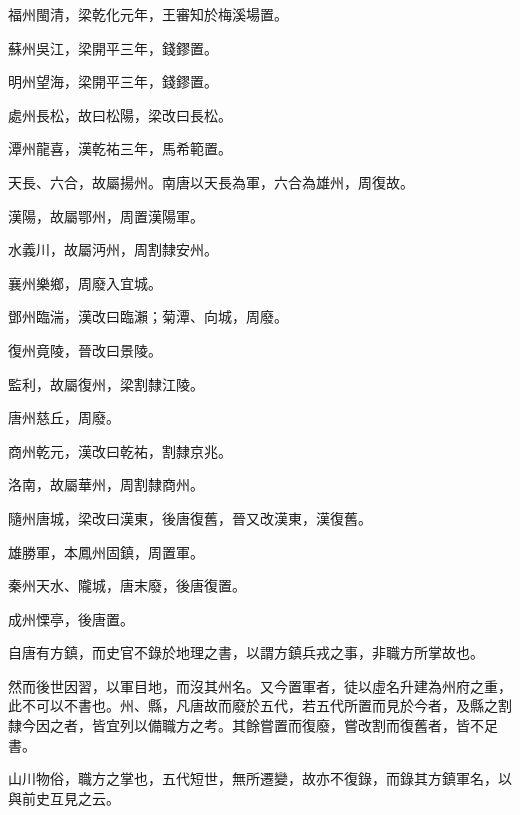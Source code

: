 \begin{pinyinscope}
 福州閩清，梁乾化元年，王審知於梅溪場置。



 蘇州吳江，梁開平三年，錢鏐置。



 明州望海，梁開平三年，錢鏐置。



 處州長松，故曰松陽，梁改曰長松。



 潭州龍喜，漢乾祐三年，馬希範置。



 天長、六合，故屬揚州。南唐以天長為軍，六合為雄州，周復故。



 漢陽，故屬鄂州，周置漢陽軍。



 水義川，故屬沔州，周割隸安州。



 襄州樂鄉，周廢入宜城。



 鄧州臨湍，漢改曰臨瀨；菊潭、向城，周廢。



 復州竟陵，晉改曰景陵。



 監利，故屬復州，梁割隸江陵。



 唐州慈丘，周廢。



 商州乾元，漢改曰乾祐，割隸京兆。



 洛南，故屬華州，周割隸商州。



 隨州唐城，梁改曰漢東，後唐復舊，晉又改漢東，漢復舊。



 雄勝軍，本鳳州固鎮，周置軍。



 秦州天水、隴城，唐末廢，後唐復置。



 成州慄亭，後唐置。



 自唐有方鎮，而史官不錄於地理之書，以謂方鎮兵戎之事，非職方所掌故也。



 然而後世因習，以軍目地，而沒其州名。又今置軍者，徒以虛名升建為州府之重，此不可以不書也。州、縣，凡唐故而廢於五代，若五代所置而見於今者，及縣之割隸今因之者，皆宜列以備職方之考。其餘嘗置而復廢，嘗改割而復舊者，皆不足書。



 山川物俗，職方之掌也，五代短世，無所遷變，故亦不復錄，而錄其方鎮軍名，以與前史互見之云。



\end{pinyinscope}